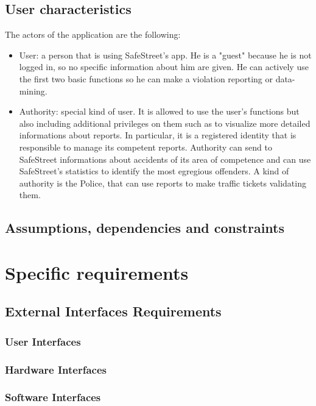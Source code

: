 \documentclass{article}
\begin{document}
    
        \subsection{User characteristics}
        The actors of the application are the following:
        \begin{itemize}
            \item User: a person that is using SafeStreet's app. He is a "guest" because he is not logged in, so no specific information about him are given. He can actively use the first two basic functions so he can make a violation reporting or data-mining.
            \item Authority: special kind of user. It is allowed to use the user's functions but also including additional privileges on them such as to visualize more detailed informations about reports. In particular, it is a registered identity that is responsible to manage its competent reports. Authority can send to SafeStreet informations about accidents of its area of competence and can use SafeStreet's statistics to identify the most egregious offenders.
            A kind of authority is the Police, that can use reports to make traffic tickets validating them.
        \end{itemize}
        
        \subsection{Assumptions, dependencies and constraints}
        
        
    \section{Specific requirements}
        \subsection{External Interfaces Requirements}
            \subsubsection{User Interfaces}
            \subsubsection{Hardware Interfaces}
            \subsubsection{Software Interfaces}
\end{document}
